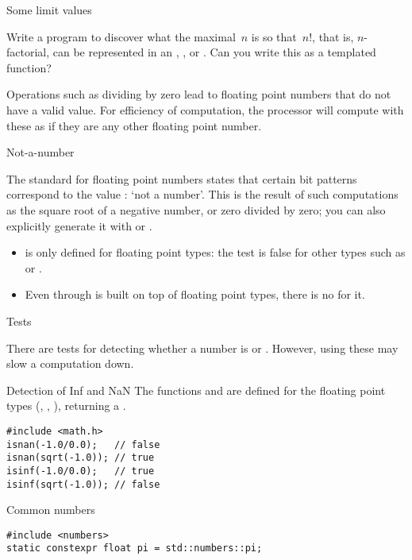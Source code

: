 \begin{block}{Some limit values}
  \label{sl:ieee-limits}
    \def\codesize{\ttfamily\scriptsize}
\end{block}

\begin{exercise}
  \label{ex:big-factorial}
  Write a program to discover what the maximal~$n$ is so that~$n!$,
  that is, $n$-factorial, can be represented in an , ,
  or . Can you write this as a templated function?
\end{exercise}

Operations such as dividing by zero lead to floating point numbers
that do not have a valid value. For efficiency of computation, the
processor will compute with these as if they are any other floating
point number.

 {Not-a-number}
\label{sec:naninf}

The  standard for floating point numbers
states that certain bit patterns correspond to the value
: `not a number'.
This is the result of such computations as the square root
of a negative number, or zero divided by zero;
you can also explicitly generate it
with  or .

\begin{itemize}
\item {} is only defined for floating point types:
  the test  is false for other types
  such as  or .
\item Even through  is built on top of
  floating point types, there is no  for it.
\end{itemize}


 {Tests}

There are tests for detecting whether a number is  or
. However, using these may slow a computation down.

\begin{block}{Detection of Inf and NaN}
  The functions  and  are
  defined for the floating point types (, , ), returning a .
\begin{lstlisting}
#include <math.h>
isnan(-1.0/0.0);   // false
isnan(sqrt(-1.0)); // true
isinf(-1.0/0.0);   // true
isinf(sqrt(-1.0)); // false
\end{lstlisting}
\end{block}

 {Common numbers}
\label{sec:std-numbers}

\begin{lstlisting}
#include <numbers>
static constexpr float pi = std::numbers::pi;
\end{lstlisting}

